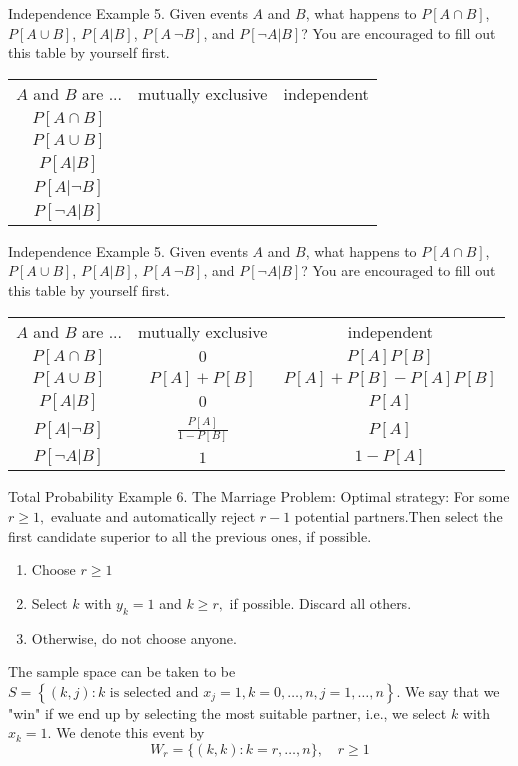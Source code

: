 \documentclass[hyperref={pdfpagelabels=false}]{beamer}
\newcommand{\structb}[1]{\textcolor[rgb]{0.2,0.2,0.7}{#1}}
\begin{document}
%
\begin{frame}{Independence}
    \justifying
    \structb{Example 5.} Given events $A$ and $B$, what happens to $P[A \cap B]$, $P[A \cup B]$, $P[A | B]$, $P[A \ \neg B]$, and $P[\neg A | B]$? You are encouraged to fill out this table by yourself first.
    ~\\
    \centering
    \begin{tabular}{c|c|c}
        $A$ and $B$ are ... & mutually exclusive & independent \\
        $P[A \cap B]$ & & \\
        $P[A \cup B]$ & & \\
        $P[A | B]$ & & \\
        $P[A | \neg B]$ & & \\
        $P[\neg A | B]$ & & 
    \end{tabular}
\end{frame}
%
\begin{frame}{Independence}
    \justifying
    \structb{Example 5.} Given events $A$ and $B$, what happens to $P[A \cap B]$, $P[A \cup B]$, $P[A | B]$, $P[A \ \neg B]$, and $P[\neg A | B]$? You are encouraged to fill out this table by yourself first.
    ~\\
    \centering
    \begin{tabular}{c|c|c}
        $A$ and $B$ are ... & mutually exclusive & independent \\
        $P[A \cap B]$ & $0$ & $P[A]P[B]$ \\
        $P[A \cup B]$ & $P[A] + P[B]$ & $P[A] + P[B] - P[A]P[B]$ \\
        $P[A | B]$ & $0$ & $P[A]$ \\
        $P[A | \neg B]$ & $\frac{P[A]}{1 - P[B]}$ & $P[A]$ \\
        $P[\neg A | B]$ & $1$ & $1 - P[A]$ 
    \end{tabular}
\end{frame}
%
\begin{frame}{Total Probability}
    \justifying
    \structb{Example 6.} The Marriage Problem: Optimal strategy: For some $r \geq 1,$ evaluate and automatically reject $r-1$ potential partners.Then select the first candidate superior to all the previous ones, if possible.
    \begin{enumerate}
        \item Choose $r \geq 1$
        \item Select $k$ with $y_{k}=1$ and $k \geq r,$ if possible. Discard all others.
        \item Otherwise, do not choose anyone.
    \end{enumerate}
    The sample space can be taken to be $S=\left\{(k, j): k \text { is selected and } x_{j}=1, k=0, \dots, n, j=1, \dots, n\right\}$. We say that we "win" if we end up by selecting the most suitable partner, i.e., we select $k$ with $x_{k}=1 .$ We denote this event by
    $$
        W_{r}=\{(k, k): k=r, \dots, n\}, \quad r \geq 1
    $$
\end{frame}
\end{document}
